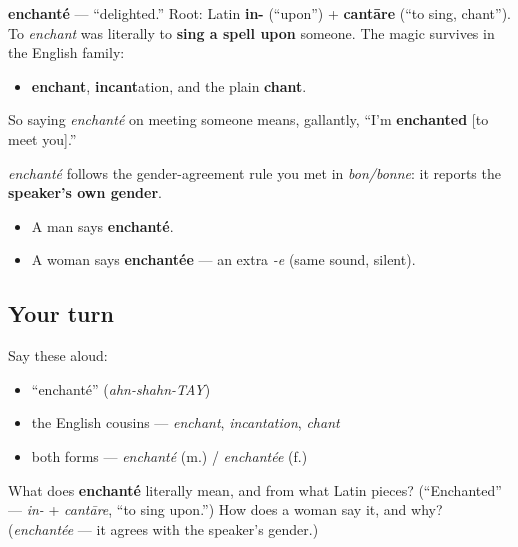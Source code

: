 \begin{cousinweb}
\textbf{enchanté} — \textquotedblleft{}delighted.\textquotedblright{} Root: Latin \textbf{in-} (\textquotedblleft{}upon\textquotedblright{}) + \textbf{cantāre} (\textquotedblleft{}to sing, chant\textquotedblright{}). To \emph{enchant} was literally to \textbf{sing a spell upon} someone. The magic survives in the English family:

\begin{itemize}
\raggedright
  \item \textbf{enchant}, \textbf{incant}ation, and the plain \textbf{chant}.
\end{itemize}

So saying \emph{enchanté} on meeting someone means, gallantly, \textquotedblleft{}I'm \textbf{enchanted} {[}to meet you{]}.\textquotedblright{}
\end{cousinweb}

\begin{grammarlens}[title={Grammar Lens: it agrees with \emph{you}}]
\emph{enchanté} follows the gender-agreement rule you met in \emph{bon/bonne}: it reports the \textbf{speaker's own gender}.

\begin{itemize}
\raggedright
  \item A man says \textbf{enchanté}.
  \item A woman says \textbf{enchantée} — an extra \emph{-e} (same sound, silent).
\end{itemize}
\end{grammarlens}

\subsection*{Your turn}
Say these aloud:

\begin{itemize}
\raggedright
  \item \textquotedblleft{}enchanté\textquotedblright{} (\emph{ahn-shahn-TAY})
  \item the English cousins — \emph{enchant}, \emph{incantation}, \emph{chant}
  \item both forms — \emph{enchanté} (m.) / \emph{enchantée} (f.)
\end{itemize}

\begin{tcolorbox}[breakable,colback=teal!4,colframe=teal!35!black,title={Before you move on}]
What does \textbf{enchanté} literally mean, and from what Latin pieces? (\textquotedblleft{}Enchanted\textquotedblright{} — \emph{in-} + \emph{cantāre}, \textquotedblleft{}to sing upon.\textquotedblright{}) How does a woman say it, and why? (\emph{enchantée} — it agrees with the speaker's gender.)
\end{tcolorbox}
